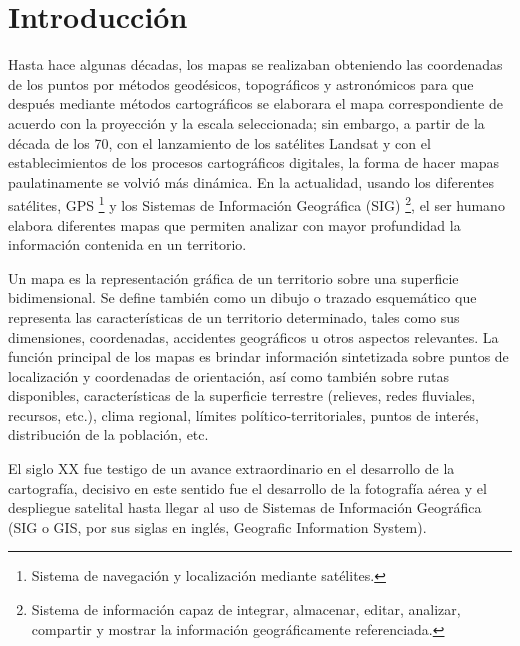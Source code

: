 \setcounter{page}{1}

\chapter{Introducci\'on}

Hasta hace algunas d\'ecadas, los mapas se realizaban obteniendo las coordenadas de los puntos por m\'etodos geod\'esicos, topogr\'aficos y astron\'omicos para que despu\'es mediante m\'etodos cartogr\'aficos se elaborara el mapa correspondiente de acuerdo con la proyecci\'on y la escala seleccionada; sin embargo, a partir de la d\'ecada de los 70, con el lanzamiento de los sat\'elites Landsat y con el establecimientos de los procesos cartogr\'aficos digitales, la forma de hacer mapas paulatinamente se volvi\'o m\'as din\'amica. En la actualidad, usando los diferentes sat\'elites, GPS \footnote{Sistema de navegaci\'on y localizaci\'on mediante sat\'elites.} y los Sistemas de Informaci\'on Geogr\'afica (SIG) \footnote{Sistema de informaci\'on capaz de integrar, almacenar, editar, analizar, compartir y mostrar la informaci\'on geogr\'aficamente referenciada.}, el ser humano elabora diferentes mapas que permiten analizar con mayor profundidad la informaci\'on contenida en un territorio.

Un mapa es la representaci\'on gr\'afica de un territorio sobre una superficie bidimensional. Se define tambi\'en como un dibujo o trazado esquem\'atico que representa las caracter\'isticas de un territorio determinado, tales como sus dimensiones, coordenadas, accidentes geogr\'aficos u otros aspectos relevantes. La funci\'on principal de los mapas es brindar
informaci\'on sintetizada sobre puntos de localizaci\'on y coordenadas de orientaci\'on, as\'i como tambi\'en sobre rutas disponibles, caracter\'isticas de la superficie terrestre (relieves, redes fluviales, recursos, etc.), clima regional, l\'imites pol\'itico-territoriales, puntos de inter\'es, distribuci\'on de la poblaci\'on, etc.\cite{mapa}

El siglo XX fue testigo de un avance extraordinario en el desarrollo de la cartograf\'ia, decisivo en este sentido fue el desarrollo de la fotograf\'ia a\'erea y el despliegue satelital hasta llegar al uso de Sistemas de Informaci\'on Geogr\'afica \cite{SIG} (SIG o GIS, por sus siglas en ingl\'es, Geografic Information System).

